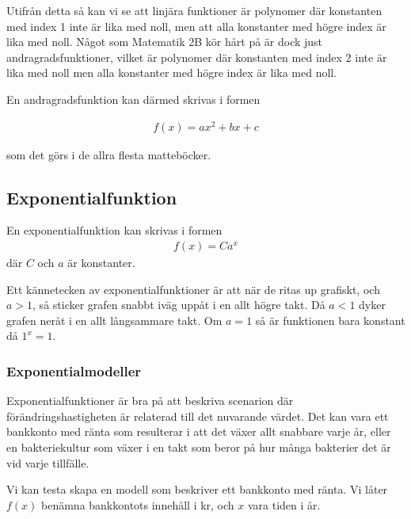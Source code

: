Utifrån detta så kan vi se att linjära funktioner är polynomer där konstanten med index 1 inte är lika med noll, men att alla konstanter med högre index är lika med noll. Något som Matematik 2B kör hårt på är dock just andragradsfunktioner, vilket är polynomer där konstanten med index 2 inte är lika med noll men alla konstanter med högre index är lika med noll.

En andragradsfunktion kan därmed skrivas i formen

\begin{align}
	f(x) = ax^2 + bx + c
\end{align}

som det görs i de allra flesta matteböcker.

\subsubsection{}

\newpage
\subsection{Exponentialfunktion}

\begin{definition}
	En exponentialfunktion kan skrivas i formen
	\begin{align}
		f(x)=Ca^x
	\end{align}
	där $C$ och $a$ är konstanter.
 \end{definition}
 

Ett kännetecken av exponentialfunktioner är att när de ritas up grafiskt, och $a > 1$, så sticker grafen snabbt iväg uppåt i en allt högre takt. Då $a < 1$ dyker grafen neråt i en allt långsammare takt. Om $a=1$ så är funktionen bara konstant då $1^x=1$.

\subsubsection{Exponentialmodeller}

Exponentialfunktioner är bra på att beskriva scenarion där förändringshastigheten är relaterad till det nuvarande värdet. Det kan vara ett bankkonto med ränta som resulterar i att det växer allt snabbare varje år, eller en bakteriekultur som växer i en takt som beror på hur många bakterier det är vid varje tillfälle.

Vi kan testa skapa en modell som beskriver ett bankkonto med ränta. Vi låter $f(x)$ benämna bankkontots innehåll i kr, och $x$ vara tiden i år.

